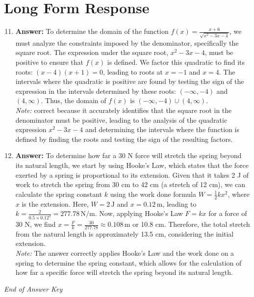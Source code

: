 \documentclass[12pt]{article}
\begin{document}
\section*{Long Form Response}
\begin{enumerate}[label=\arabic*.]
\setcounter{enumi}{10}
\item \textbf{Answer:} To determine the domain of the function \( f(x) = \frac{x+6}{\sqrt{x^2-3 x-4}} \), we must analyze the constraints imposed by the denominator, specifically the square root. The expression under the square root, \( x^2 - 3 x - 4 \), must be positive to ensure that \( f(x) \) is defined. We factor this quadratic to find its roots: \( (x-4)(x+1) = 0 \), leading to roots at \( x = -1 \) and \( x = 4 \). The intervals where the quadratic is positive are found by testing the sign of the expression in the intervals determined by these roots: \( (-\infty, -4) \) and \( (4, \infty) \). Thus, the domain of \( f(x) \) is \( (-\infty, -4) \cup (4, \infty) \).
\\ \textit{Note:} correct because it accurately identifies that the square root in the denominator must be positive, leading to the analysis of the quadratic expression \( x^2 - 3 x - 4 \) and determining the intervals where the function is defined by finding the roots and testing the sign of the resulting factors.
\item \textbf{Answer:} To determine how far a 30 N force will stretch the spring beyond its natural length, we start by using Hooke's Law, which states that the force exerted by a spring is proportional to its extension. Given that it takes 2 J of work to stretch the spring from 30 cm to 42 cm (a stretch of 12 cm), we can calculate the spring constant \( k \) using the work done formula \( W = \frac{1}{2} k x^2 \), where \( x \) is the extension. Here, \( W = 2 \, \text{J} \) and \( x = 0.12 \, \text{m} \), leading to \( k = \frac{2}{0.5 \times 0.12^2} = 277.78 \, \text{N/m} \). Now, applying Hooke's Law \( F = kx \) for a force of 30 N, we find \( x = \frac{F}{k} = \frac{30}{277.78} \approx 0.108 \, \text{m} \) or 10.8 cm. Therefore, the total stretch from the natural length is approximately 13.5 cm, considering the initial extension.
\\ \textit{Note:} The answer correctly applies Hooke's Law and the work done on a spring to determine the spring constant, which allows for the calculation of how far a specific force will stretch the spring beyond its natural length.
\end{enumerate}

\vfill
\noindent\textit{End of Answer Key}
\end{document}
